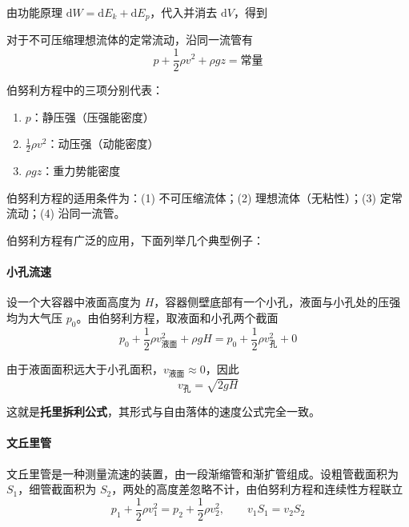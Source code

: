 由功能原理 $\mathrm{d}W = \mathrm{d}E_k + \mathrm{d}E_p$，代入并消去 $\mathrm{d}V$，得到

\begin{theorem}[伯努利方程]
    对于不可压缩理想流体的定常流动，沿同一流管有
    \begin{equation}
        p + \frac{1}{2}\rho v^2 + \rho g z = \text{常量}
    \end{equation}
\end{theorem}

伯努利方程中的三项分别代表：
\begin{enumerate}
    \item $p$：静压强（压强能密度）
    \item $\frac{1}{2}\rho v^2$：动压强（动能密度）
    \item $\rho g z$：重力势能密度
\end{enumerate}

\begin{remark}
    伯努利方程的适用条件为：(1) 不可压缩流体；(2) 理想流体（无粘性）；(3) 定常流动；(4) 沿同一流管。
\end{remark}

伯努利方程有广泛的应用，下面列举几个典型例子：

\paragraph*{小孔流速} 设一个大容器中液面高度为 $H$，容器侧壁底部有一个小孔，液面与小孔处的压强均为大气压 $p_0$。由伯努利方程，取液面和小孔两个截面
\begin{equation}
    p_0 + \frac{1}{2}\rho v_{\text{液面}}^2 + \rho g H = p_0 + \frac{1}{2}\rho v_{\text{孔}}^2 + 0
\end{equation}

由于液面面积远大于小孔面积，$v_{\text{液面}} \approx 0$，因此
\begin{equation}
    v_{\text{孔}} = \sqrt{2gH}
\end{equation}

这就是\textbf{托里拆利公式}，其形式与自由落体的速度公式完全一致。

\paragraph*{文丘里管} 文丘里管是一种测量流速的装置，由一段渐缩管和渐扩管组成。设粗管截面积为 $S_1$，细管截面积为 $S_2$，两处的高度差忽略不计，由伯努利方程和连续性方程联立
\begin{equation}
    p_1 + \frac{1}{2}\rho v_1^2 = p_2 + \frac{1}{2}\rho v_2^2, \qquad v_1 S_1 = v_2 S_2
\end{equation}

